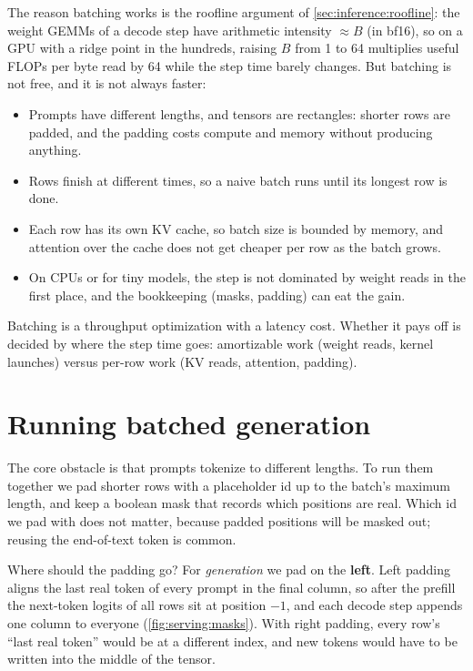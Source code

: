 The reason batching works is the roofline argument of \cref{sec:inference:roofline}: the weight
GEMMs of a decode step have arithmetic intensity $\approx B$ (in bf16), so on a GPU with a ridge point
in the hundreds, raising $B$ from 1 to 64 multiplies useful FLOPs per byte read by 64 while the step
time barely changes. But batching is not free, and it is not always faster:
\begin{itemize}
  \item Prompts have different lengths, and tensors are rectangles: shorter rows are padded, and
    the padding costs compute and memory without producing anything.
  \item Rows finish at different times, so a naive batch runs until its longest row is done.
  \item Each row has its own KV cache, so batch size is bounded by memory, and attention over the
    cache does not get cheaper per row as the batch grows.
  \item On CPUs or for tiny models, the step is not dominated by weight reads in the first place,
    and the bookkeeping (masks, padding) can eat the gain.
\end{itemize}

\begin{keyidea}
Batching is a throughput optimization with a latency cost. Whether it pays off is decided by
where the step time goes: amortizable work (weight reads, kernel launches) versus per-row work
(KV reads, attention, padding).
\end{keyidea}

\section{Running batched generation}\label{sec:serving:batched}

The core obstacle is that prompts tokenize to different lengths. To run them together we pad
shorter rows with a placeholder id up to the batch's maximum length, and keep a boolean mask that
records which positions are real. Which id we pad with does not matter, because padded positions
will be masked out; reusing the end-of-text token is common.

Where should the padding go? For \emph{generation} we pad on the \textbf{left}. Left padding aligns
the last real token of every prompt in the final column, so after the prefill the next-token logits
of all rows sit at position $-1$, and each decode step appends one column to everyone
(\cref{fig:serving:masks}). With right padding, every row's ``last real token'' would be at a
different index, and new tokens would have to be written into the middle of the tensor.


